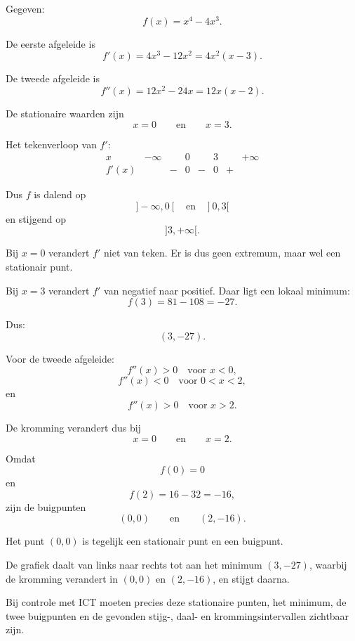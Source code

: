 \documentclass{ximera}
\begin{document}
\begin{oefening}{\oefU\ESS}
\begin{oplossing}

Gegeven:
\[
f(x)=x^4-4x^3.
\]

De eerste afgeleide is
\[
f'(x)=4x^3-12x^2
=4x^2(x-3).
\]

De tweede afgeleide is
\[
f''(x)=12x^2-24x
=12x(x-2).
\]

De stationaire waarden zijn
\[
x=0
\qquad\text{en}\qquad
x=3.
\]

Het tekenverloop van $f'$:
\[
\begin{array}{c|ccccccc}
x & -\infty & & 0 & & 3 & & +\infty\\ \hline
f'(x) & & - & 0 & - & 0 & + &
\end{array}
\]

Dus $f$ is dalend op
\[
]-\infty,0[
\quad\text{en}\quad
]0,3[
\]
en stijgend op
\[
]3,+\infty[.
\]

Bij $x=0$ verandert $f'$ niet van teken. Er is dus geen extremum, maar wel
een stationair punt.

Bij $x=3$ verandert $f'$ van negatief naar positief. Daar ligt een lokaal
minimum:
\[
f(3)=81-108=-27.
\]

Dus:
\[
\boxed{(3,-27)}.
\]

Voor de tweede afgeleide:
\[
f''(x)>0 \quad \text{voor }x<0,
\]
\[
f''(x)<0 \quad \text{voor }0<x<2,
\]
en
\[
f''(x)>0 \quad \text{voor }x>2.
\]

De kromming verandert dus bij
\[
x=0
\qquad\text{en}\qquad
x=2.
\]

Omdat
\[
f(0)=0
\]
en
\[
f(2)=16-32=-16,
\]
zijn de buigpunten
\[
\boxed{(0,0)}
\qquad\text{en}\qquad
\boxed{(2,-16)}.
\]

Het punt $(0,0)$ is tegelijk een stationair punt en een buigpunt.

De grafiek daalt van links naar rechts tot aan het minimum $(3,-27)$,
waarbij de kromming verandert in $(0,0)$ en $(2,-16)$, en stijgt daarna.

Bij controle met ICT moeten precies deze stationaire punten, het minimum,
de twee buigpunten en de gevonden stijg-, daal- en krommingsintervallen
zichtbaar zijn.

\end{oplossing}

\end{oefening}


\end{document}
